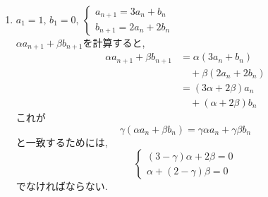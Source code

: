\begin{enumerate}[label=(\arabic*),parsep=3pt]
\begin{enumerate}
                2式を辺々加えると,
                \[
                  2a_n=2\cdot4^{n-1}
                \]
                であるから,
                \[
                  a_n=4^{n-1}.
                \]
                また,
                \[
                  b_n=a_n=4^{n-1}.
                \]
          \item 【解法2】\\
                2つの式を辺々加えると,
                \begin{align*}
                  a_{n+1}+b_{n+1}
                   & =(3a_n+b_n)+(a_n+3b_n) \\
                   & =4(a_n+b_n).
                \end{align*}
                よって,
                \[
                  a_n+b_n=(a_1+b_1)4^{n-1}=2\cdot4^{n-1}. \tag{1}
                \]

                また,2つの式を辺々引くと,
                \begin{align*}
                  a_{n+1}-b_{n+1}
                   & =(3a_n+b_n)-(a_n+3b_n) \\
                   & =2(a_n-b_n).
                \end{align*}
                よって,
                \[
                  a_n-b_n=(a_1-b_1)2^{n-1}=0. \tag{2}
                \]

                \((1)+(2)\)をすると,
                \[
                  2a_n=2\cdot4^{n-1}
                \]
                なので,
                \[
                  a_n=4^{n-1}.
                \]

                また,\((1)-(2)\)をすると,
                \[
                  2b_n=2\cdot4^{n-1}
                \]
                なので,
                \[
                  b_n=4^{n-1}.
                \]
        \end{enumerate}
  \item $\displaystyle a_1=1,\,b_1=0,\ \begin{cases}a_{n+1}=3a_n+b_n\\ b_{n+1}=2a_n+2b_n\end{cases}$\\
        $\alpha a_{n+1}+\beta b_{n+1}$を計算すると,
        \begin{align*}
          \alpha a_{n+1}+\beta b_{n+1}
           &=\alpha(3a_n+b_n)\\
           &\quad +\beta(2a_n+2b_n)\\
           &=(3\alpha+2\beta)a_n\\
           &\quad +(\alpha+2\beta)b_n
        \end{align*}
        これが
        \[
          \gamma(\alpha a_n+\beta b_n)
          =\gamma\alpha a_n+\gamma\beta b_n
        \]
        と一致するためには,
        \[
          \begin{cases}
            (3-\gamma)\alpha+2\beta=0 \\
            \alpha+(2-\gamma)\beta=0
          \end{cases}
        \]
        でなければならない.


\end{enumerate}
